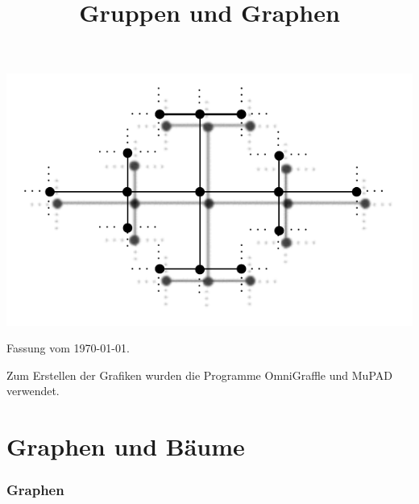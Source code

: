 \documentclass[a4paper, 12pt, twoside]{article}
\title{\Huge \textbf{
\textsf{Gruppen und Graphen}}}
\date{}
\begin{document}
\maketitle
\begin{center}
	\includegraphics{grugraImages/titel}
\end{center}

\newpage

\renewcommand{\thepage}{\roman{page}} 

\newpage \thispagestyle{empty}
{\footnotesize
{}
Fassung vom \today.

Zum Erstellen der Grafiken wurden die Programme {\sf OmniGraffle} und
{\sf MuPAD} verwendet.
}
\cleardoublepage

\tableofcontents
\cleardoublepage

\setcounter{page}{1} %
\renewcommand{\thepage}{\arabic{page}} 

\cleardoublepage
\part{Graphen und Bäume}

\section{Graphen}\label{sec_graphen}
\end{document}
